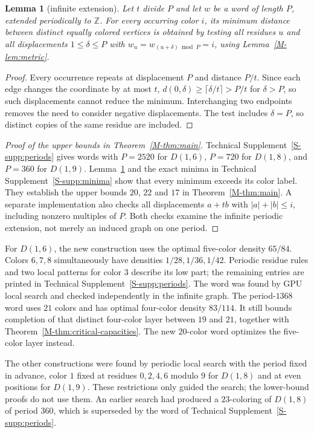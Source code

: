 \documentclass[11pt,reqno]{amsart}
\theoremstyle{plain}
\newtheorem{lemma}[theorem]{Lemma}
\newcommand{\D}[1]{D(1,#1)}
\theoremstyle{plain}
\theoremstyle{plain}
\begin{document}
\begin{lemma}[infinite extension]\label{M-lem:ext}
Let $t$ divide $P$ and let $w$ be a word of length $P$, extended periodically
to $\mathbb{Z}$. For every occurring color $i$, its minimum distance between
distinct equally colored vertices is obtained by testing all residues $u$ and
all displacements $1 \le \delta \le P$ with
$w_u = w_{(u+\delta) \bmod P} = i$, using Lemma~\ref{M-lem:metric}.
\end{lemma}

\begin{proof}
Every occurrence repeats at displacement $P$ and distance $P/t$. Since each edge changes
the coordinate by at most $t$, $d(0,\delta)\ge\lceil\delta/t\rceil>P/t$ for $\delta>P$, so such
displacements cannot reduce the minimum. Interchanging two
endpoints removes the need to consider negative displacements. The test
includes $\delta = P$, so distinct copies of the same residue are included.
\end{proof}

\begin{proof}[Proof of the upper bounds in Theorem~\ref{M-thm:main}]
Technical Supplement~\ref*{S-supp:periods} gives words with $P=2520$ for $\D{6}$, $P = 720$ for $\D{8}$,
and $P = 360$ for $\D{9}$. Lemma~\ref{M-lem:ext} and the exact
minima in Technical Supplement~\ref*{S-supp:minima} show that every minimum exceeds its color label. They
establish the upper bounds $20$, $22$ and $17$ in Theorem~\ref{M-thm:main}. A separate
implementation also checks all displacements $a + tb$ with $|a| + |b| \le i$,
including nonzero multiples of $P$. Both checks examine the infinite periodic
extension, not merely an induced graph on one period.
\end{proof}

For $\D{6}$, the new construction uses the optimal five-color density
$65/84$. Colors $6,7,8$ simultaneously have densities $1/28,1/36,1/42$.
Periodic residue rules and two local patterns for color $3$ describe its
low part; the remaining entries are printed in Technical Supplement~\ref*{S-supp:periods}. The word was
found by GPU local search and checked independently in the infinite graph.
The period-$1368$ word uses $21$ colors and has optimal
four-color density $83/114$. It still bounds completion of that distinct
four-color layer between $19$ and $21$, together with
Theorem~\ref{M-thm:critical-capacities}. The new $20$-color word optimizes
the five-color layer instead.

The other constructions were found by periodic local search with the period fixed in advance,
color $1$ fixed at residues $0,2,4,6$ modulo $9$ for $\D{8}$ and at even positions for $\D{9}$.
These restrictions only guided the search; the lower-bound proofs do not use them. An earlier
search had produced a $23$-coloring of $\D{8}$ of period $360$, which is superseded by the word
of Technical Supplement~\ref*{S-supp:periods}.
\end{document}
